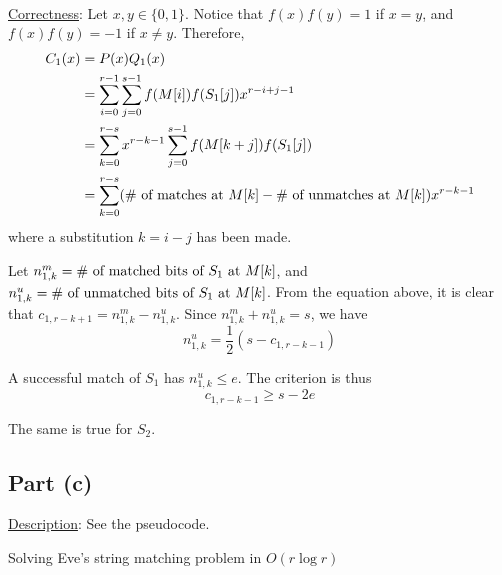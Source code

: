 \documentclass{article}
\begin{document}
~

\noindent\underline{Correctness}: Let $x,y\in\{0,1\}$. Notice that $f(x)f(y)=1$ if $x=y$, and $f(x)f(y)=-1$ if $x\neq y$. Therefore,
\begin{align*}
C_1(x)&=P(x)Q_1(x)\\
&=\sum_{i=0}^{r-1}\sum_{j=0}^{s-1}f(M[i])f(S_1[j])x^{r-i+j-1}\\
&=\sum_{k=0}^{r-s}x^{r-k-1}\sum_{j=0}^{s-1}f(M[k+j])f(S_1[j])\\
&=\sum_{k=0}^{r-s}(\textup{\# of matches at $M[k]$}-\textup{\# of unmatches at $M[k]$})x^{r-k-1}
\end{align*}
where a substitution $k=i-j$ has been made.

Let $n^m_{1,k}=\textup{\# of matched bits of $S_1$ at $M[k]$}$, and $n^u_{1,k}=\textup{\# of unmatched bits of $S_1$ at $M[k]$}$. From the equation above, it is clear that $c_{1,r-k+1}=n^m_{1,k}-n^u_{1,k}$. Since $n^m_{1,k}+n^u_{1,k}=s$, we have
\begin{equation*}
n^u_{1,k}=\frac{1}{2}(s-c_{1,r-k-1})
\end{equation*}

A successful match of $S_1$ has $n^u_{1,k}\leqslant e$. The criterion is thus
\begin{equation*}
c_{1,r-k-1}\geqslant s-2e
\end{equation*}

The same is true for $S_2$.

\subsection{Part (c)}
\noindent\underline{Description}: See the pseudocode.
\begin{algorithm}
\caption{Solving Eve's string matching problem in $O(r\log r)$}
\begin{algorithmic}[1]
	\EndIf
	\EndIf
\EndFor
{}
\Else{}
\EndIf
\EndProcedure
\end{algorithmic}
\end{algorithm}
\end{document}
